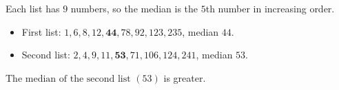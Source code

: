 Each list has $9$ numbers, so the median is the $5$th number in increasing order.
\begin{itemize}
\item First list: $1,6,8,12,\mathbf{44},78,92,123,235$, median $44$.
\item Second list: $2,4,9,11,\mathbf{53},71,106,124,241$, median $53$.
\end{itemize}
The $\boxed{\text{median of the second list }(53)}$ is greater.
